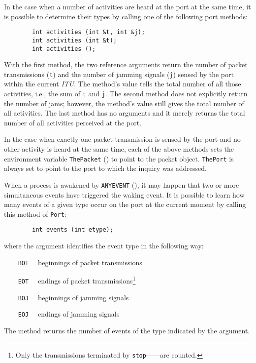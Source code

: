 In the case when a number of activities are heard at the port at the same time,
it is possible to determine their types by calling one of the following
port methods:
\begin{verbatim}
        int activities (int &t, int &j);
        int activities (int &t);
        int activities ();
\end{verbatim}

With the first method,
the two reference arguments return the number of packet transmissions ({\tt t})
and the number of jamming signals ({\tt j}) sensed by the port within
the current {\em ITU}.
The method's value tells the total number of all those activities,
i.e., the sum of {\tt t} and {\tt j}.
The second method does not explicitly
return the number of jams; however, the method's
value still gives the total number of all activities.
The last method has no arguments and it merely returns the total number of all
activities perceived at the port.

In the case when exactly one packet transmission is sensed by the port and
no other activity is heard at the same time, each of the above methods
sets the environment variable {\tt ThePacket} () to point
to the packet object.
{\tt ThePort} is always set to point to the port to which the inquiry was
addressed.

When a process is awakened by {\tt ANYEVENT} (), it may
happen that two or more simultaneous events have triggered the waking
event.
It is possible to learn how many events of a given type
occur on the port at the current moment by calling this method of {\tt Port}:
\begin{verbatim}
        int events (int etype);
\end{verbatim}
where the argument identifies the event type in the following way:

\bigskip

\noindent
{\tt ~~~~BOT~~} beginnings of packet transmissions

\noindent
{\tt ~~~~EOT~~} endings of packet
transmissions\footnote{Only the transmissions terminated by
{\tt stop}------are counted.}

\noindent
{\tt ~~~~BOJ~~} beginnings of jamming signals

\noindent
{\tt ~~~~EOJ~~} endings of jamming signals

\bigskip

\noindent
The method returns the number of events of the type indicated by the argument.


